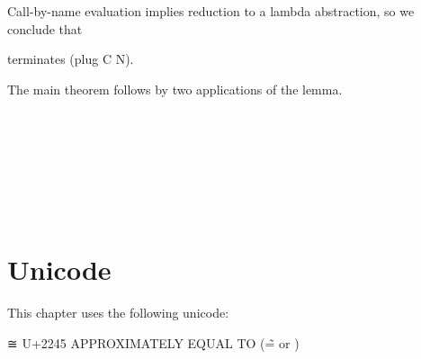 Call-by-name evaluation implies reduction to a lambda abstraction, so we
conclude that

\begin{myDisplay}
terminates (plug C N).
\end{myDisplay}

The main theorem follows by two applications of the lemma.

\begin{fence}
\begin{code}%
\>[0]\AgdaSpace{}%
\AgdaSymbol{:}\AgdaSpace{}%
\AgdaSymbol{\}}\AgdaSpace{}%
\AgdaSymbol{\{}\AgdaSpace{}%
\AgdaSpace{}%
\AgdaSymbol{:}\AgdaSpace{}%
\AgdaSpace{}%
\AgdaSpace{}%
\AgdaSymbol{\}}\<%
\\
\>[0][@{}l@{\AgdaIndent{0}}]%
\>[2]%
\>[176I]\AgdaSpace{}%
\AgdaSpace{}%
\AgdaSpace{}%
\AgdaSpace{}%
\<%
\\
\>[.][@{}l@{}]\<[176I]%
\>[4]\AgdaComment{---------}\<%
\\
%
\>[2]\AgdaSpace{}%
\AgdaSpace{}%
\AgdaSpace{}%
\<%
\\
\>[0]\AgdaSymbol{\{}\AgdaSymbol{\}\{}\AgdaSymbol{\}\{}\AgdaSymbol{\}}\AgdaSpace{}%
\AgdaSpace{}%
\AgdaSymbol{\{}\AgdaSymbol{\}}\AgdaSpace{}%
\AgdaSymbol{=}\<%
\\
\>[0][@{}l@{\AgdaIndent{0}}]%
\>[3]%
\>[187I]\AgdaSpace{}%
\AgdaSpace{}%
\AgdaSpace{}%
\AgdaSpace{}%
\AgdaSpace{}%
\AgdaSymbol{)}\AgdaSpace{}%
\AgdaOperator{\AgdaInductiveConstructor{,}}\<%
\\
\>[.][@{}l@{}]\<[187I]%
\>[5]\AgdaSpace{}%
\AgdaSpace{}%
\AgdaSpace{}%
\AgdaSpace{}%
\AgdaSymbol{(}\AgdaSpace{}%
\AgdaSymbol{)}\AgdaSpace{}%
\AgdaSymbol{)}\AgdaSpace{}%
\<%
\end{code}
\end{fence}

\hypertarget{unicode}{%
\section{Unicode}\label{unicode}}

This chapter uses the following unicode:

\begin{myDisplay}
≅  U+2245  APPROXIMATELY EQUAL TO (\~= or \cong)
\end{myDisplay}

